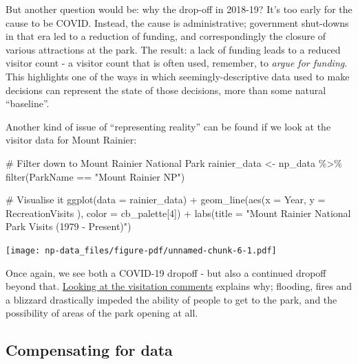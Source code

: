 \documentclass[
  letterpaper,
  DIV=11,
  numbers=noendperiod]{scrartcl}
\newenvironment{Shaded}{\begin{snugshade}}{\end{snugshade}}
\newcommand{\AttributeTok}[1]{\textcolor[rgb]{0.40,0.45,0.13}{#1}}
\newcommand{\CommentTok}[1]{\textcolor[rgb]{0.37,0.37,0.37}{#1}}
\newcommand{\DecValTok}[1]{\textcolor[rgb]{0.68,0.00,0.00}{#1}}
\newcommand{\FunctionTok}[1]{\textcolor[rgb]{0.28,0.35,0.67}{#1}}
\newcommand{\NormalTok}[1]{\textcolor[rgb]{0.00,0.23,0.31}{#1}}
\newcommand{\OtherTok}[1]{\textcolor[rgb]{0.00,0.23,0.31}{#1}}
\newcommand{\SpecialCharTok}[1]{\textcolor[rgb]{0.37,0.37,0.37}{#1}}
\newcommand{\StringTok}[1]{\textcolor[rgb]{0.13,0.47,0.30}{#1}}
\begin{document}
But another question would be: why the drop-off in 2018-19? It's too
early for the cause to be COVID. Instead, the cause is administrative;
government shut-downs in that era led to a reduction of funding, and
correspondingly the closure of various attractions at the park. The
result: a lack of funding leads to a reduced visitor count - a visitor
count that is often used, remember, to \emph{argue for funding}. This
highlights one of the ways in which seemingly-descriptive data used to
make decisions can represent the state of those decisions, more than
some natural ``baseline''.

Another kind of issue of ``representing reality'' can be found if we
look at the visitor data for Mount Rainier:

\begin{Shaded}
\begin{Highlighting}[]
\CommentTok{\# Filter down to Mount Rainier National Park}
\NormalTok{rainier\_data }\OtherTok{\textless{}{-}}\NormalTok{ np\_data }\SpecialCharTok{\%\textgreater{}\%} \FunctionTok{filter}\NormalTok{(ParkName }\SpecialCharTok{==} \StringTok{"Mount Rainier NP"}\NormalTok{)}

\CommentTok{\# Visualise it}
\FunctionTok{ggplot}\NormalTok{(}\AttributeTok{data =}\NormalTok{ rainier\_data) }\SpecialCharTok{+} 
  \FunctionTok{geom\_line}\NormalTok{(}\FunctionTok{aes}\NormalTok{(}\AttributeTok{x =}\NormalTok{ Year, }\AttributeTok{y =}\NormalTok{ RecreationVisits ), }\AttributeTok{color =}\NormalTok{ cb\_palette[}\DecValTok{4}\NormalTok{]) }\SpecialCharTok{+}
  \FunctionTok{labs}\NormalTok{(}\AttributeTok{title =} \StringTok{"Mount Rainier National Park Visits (1979 {-} Present)"}\NormalTok{)}
\end{Highlighting}
\end{Shaded}

\texttt{[image: np-data\_files/figure-pdf/unnamed-chunk-6-1.pdf]}

Once again, we see both a COVID-19 dropoff - but also a continued
dropoff beyond that.
\href{https://irma.nps.gov/Stats/SSRSReports/Park\%20Specific\%20Reports/Monthly\%20Visitation\%20Comments\%20By\%20Park?Park=MORA}{Looking
at the visitation comments} explains why; flooding, fires and a blizzard
drastically impeded the ability of people to get to the park, and the
possibility of areas of the park opening at all.

\subsection{Compensating for data}\label{compensating-for-data}
\end{document}
